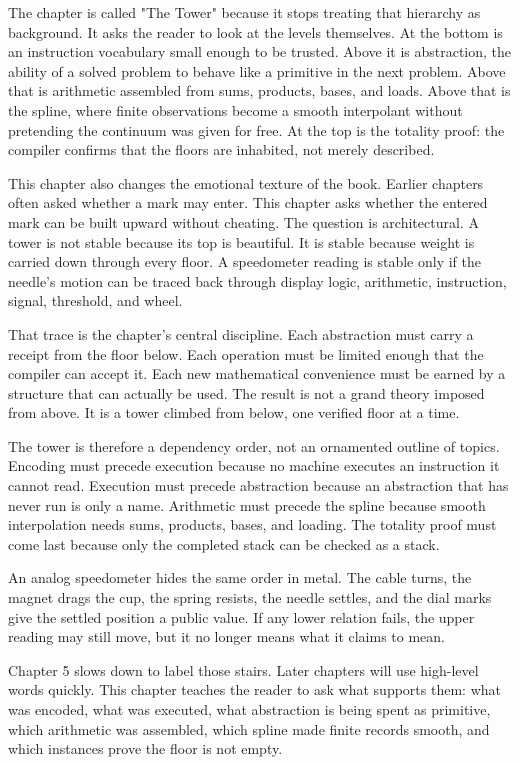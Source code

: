 The chapter is called "The Tower" because it stops treating that hierarchy as
background. It asks the reader to look at the levels themselves. At the bottom
is an instruction vocabulary small enough to be trusted. Above it is
abstraction, the ability of a solved problem to behave like a primitive in the
next problem. Above that is arithmetic assembled from sums, products, bases,
and loads. Above that is the spline, where finite observations become a smooth
interpolant without pretending the continuum was given for free. At the top is
the totality proof: the compiler confirms that the floors are inhabited, not
merely described.

This chapter also changes the emotional texture of the book. Earlier chapters
often asked whether a mark may enter. This chapter asks whether the entered
mark can be built upward without cheating. The question is architectural. A
tower is not stable because its top is beautiful. It is stable because weight
is carried down through every floor. A speedometer reading is stable only if
the needle's motion can be traced back through display logic, arithmetic,
instruction, signal, threshold, and wheel.

That trace is the chapter's central discipline. Each abstraction must carry a
receipt from the floor below. Each operation must be limited enough that the
compiler can accept it. Each new mathematical convenience must be earned by a
structure that can actually be used. The result is not a grand theory imposed
from above. It is a tower climbed from below, one verified floor at a time.

The tower is therefore a dependency order, not an ornamented outline of topics.
Encoding must precede execution because no machine executes an instruction it
cannot read. Execution must precede abstraction because an abstraction that has
never run is only a name. Arithmetic must precede the spline because smooth
interpolation needs sums, products, bases, and loading. The totality proof must
come last because only the completed stack can be checked as a stack.

An analog speedometer hides the same order in metal. The cable turns, the
magnet drags the cup, the spring resists, the needle settles, and the dial
marks give the settled position a public value. If any lower relation fails,
the upper reading may still move, but it no longer means what it claims to
mean.

Chapter 5 slows down to label those stairs. Later chapters will use high-level
words quickly. This chapter teaches the reader to ask what supports them: what
was encoded, what was executed, what abstraction is being spent as primitive,
which arithmetic was assembled, which spline made finite records smooth, and
which instances prove the floor is not empty.

